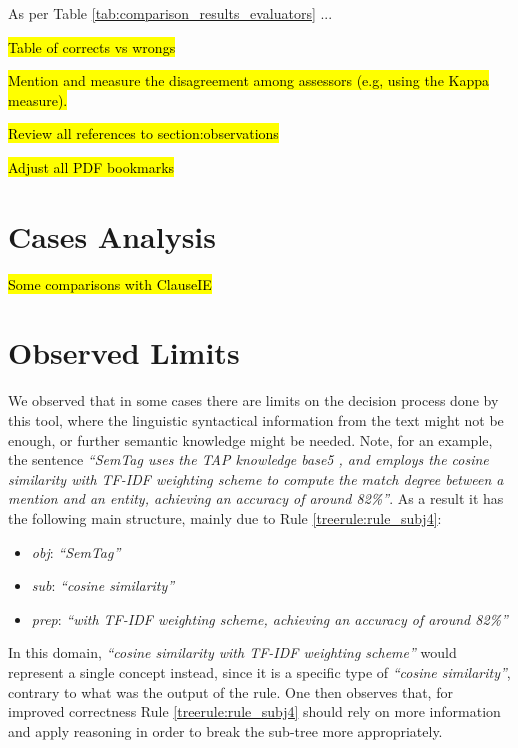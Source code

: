 \documentclass[11pt,a4paper,openright]{memoir}
\begin{document}
As per Table \ref{tab:comparison_results_evaluators} ...

\hl{Table of corrects vs wrongs}

\hl{Mention and measure the disagreement among assessors (e.g, using the Kappa measure).}

\hl{Review all references to section:observations}

\hl{Adjust all PDF bookmarks}

\section{Cases Analysis}
\label{section:cases}

\hl{Some comparisons with ClauseIE}


\section{Observed Limits}
\label{section:observations}

We observed that in some cases there are limits on the decision process done by this tool, where the linguistic syntactical information from the text might not be enough, or further semantic knowledge might be needed. Note, for an example, the sentence \emph{\enquote{SemTag uses the TAP knowledge base5 , and employs the cosine similarity with TF-IDF weighting scheme to compute the match degree between a mention and an entity, achieving an accuracy of around 82\%}}. As a result it has the following main structure, mainly due to Rule \ref{treerule:rule_subj4}:
	\begin{itemize}
	  \item \emph{obj}: \emph{\enquote{SemTag}}
	  \item \emph{sub}: \emph{\enquote{cosine similarity}}
	  \item \emph{prep}: \emph{\enquote{with TF-IDF weighting scheme, achieving an accuracy of around 82\%}}
	\end{itemize}

In this domain, \emph{\enquote{cosine similarity with TF-IDF weighting scheme}} would represent a single concept instead, since it is a specific type of \emph{\enquote{cosine similarity}}, contrary to what was the output of the rule. One then observes that, for improved correctness Rule \ref{treerule:rule_subj4} should rely on more information and apply reasoning in order to break the sub-tree more appropriately.
\end{document}
